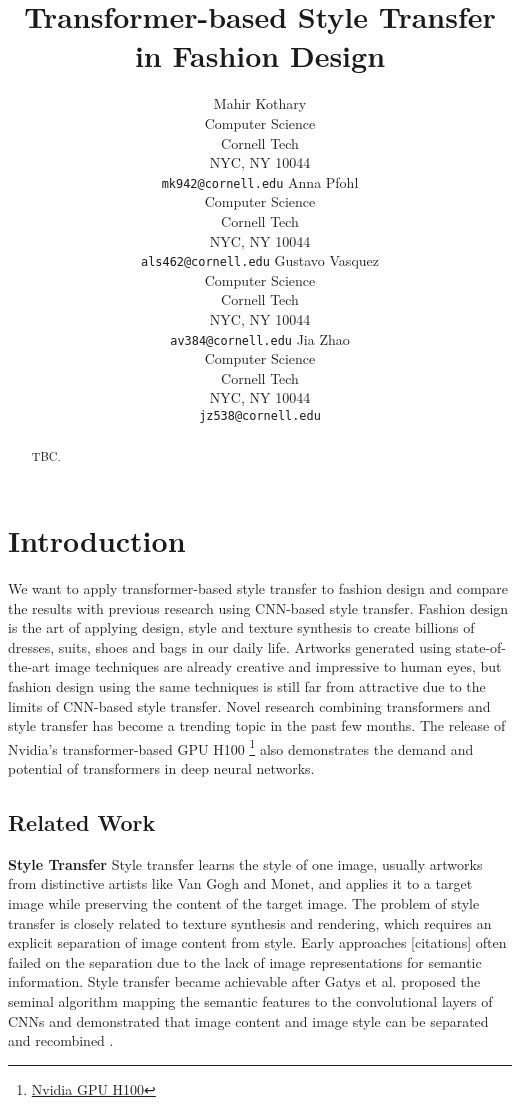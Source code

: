 \documentclass{article}
\title{Transformer-based Style Transfer in Fashion Design}
\author{%
  Mahir Kothary\\
  Computer Science\\
  Cornell Tech\\
  NYC, NY 10044 \\
  \texttt{mk942@cornell.edu} 
 \And Anna Pfohl\\
  Computer Science\\
  Cornell Tech\\
  NYC, NY 10044 \\
  \texttt{als462@cornell.edu}
\AND
  Gustavo Vasquez \\
  Computer Science\\
  Cornell Tech\\
  NYC, NY 10044 \\
  \texttt{av384@cornell.edu}
\And
  Jia Zhao \\
  Computer Science\\
  Cornell Tech\\
  NYC, NY 10044 \\
  \texttt{jz538@cornell.edu}
}
\begin{document}
\maketitle

\begin{abstract}
TBC.
\end{abstract}


\section{Introduction}
We want to apply transformer-based style transfer to fashion design and compare the results with previous research using CNN-based style transfer. Fashion design is the art of applying design, style and texture synthesis to create billions of dresses, suits, shoes and bags in our daily life. Artworks generated using state-of-the-art image techniques are already creative and impressive to human eyes, but fashion design using the same techniques is still far from attractive due to the limits of CNN-based style transfer. Novel research combining transformers and style transfer has become a trending topic in the past few months. The release of Nvidia's transformer-based GPU H100 \footnote{\href{https://www.nvidia.com/en-us/data-center/h100/}{Nvidia GPU H100}} also demonstrates the demand and potential of transformers in deep neural networks. 


\subsection{Related Work}

\textbf{Style Transfer} Style transfer learns the style of one image, usually artworks from distinctive artists like Van Gogh and Monet, and applies it to a target image while preserving the content of the target image. The problem of style transfer is closely related to texture synthesis and rendering, which requires an explicit separation of image content from style. Early approaches [citations] often failed on the separation due to the lack of image representations for semantic information. Style transfer became achievable after Gatys et al. proposed the seminal algorithm mapping the semantic features to the convolutional layers of CNNs and demonstrated that image content and image style can be separated and recombined \cite{gatys2016styleTransfer}. 
\end{document}
